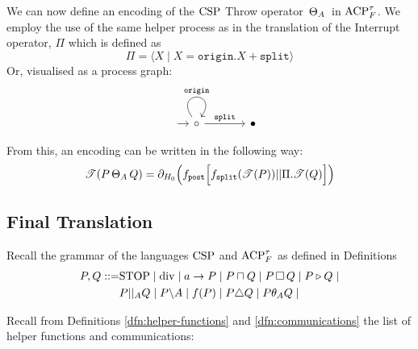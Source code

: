 \documentclass[../hons_project.tex]{subfiles}
\begin{document}
We can now define an encoding of the $\mathrm{CSP}$ Throw operator $\,\Theta_{A}\,$ in $\mathrm{ACP}_{F}^{\tau}$. We employ the use of the same helper process as in the translation of the Interrupt operator, $\Pi$ which is defined as
\[\Pi = \langle X \mid X = \mathtt{origin}.X + \mathtt{split} \rangle\]
Or, visualised as a process graph:
\[\begin{tikzcd}[column sep=scriptsize, row sep=scriptsize]
		{} & \circ && \bullet
		\arrow[shorten <=8pt, from=1-1, to=1-2]
		\arrow["{\mathtt{origin}}", from=1-2, to=1-2, loop, in=55, out=125, distance=10mm]
		\arrow["{\mathtt{split}}", from=1-2, to=1-4]
	\end{tikzcd}\]

From this, an encoding can be written in the following way:
\[\mathscr{T}(P \,\Theta_{A}\, Q) = \partial_{H_{0}}\Bigl(f_{\mathtt{post}}\Bigl[ f_{\mathtt{split}}(\mathscr{T}(P)) | | \Pi.\mathscr{T}(Q) \Bigr]\Bigr)\]





\newpage
\subsection{Final Translation}

Recall the grammar of the languages $\mathrm{CSP}$ and $\mathrm{ACP}_{F}^{\tau}$ as defined in Definitions
\begin{align*}
	P, Q ::= & \mathrm{STOP} \mid \mathrm{div} \mid a\to P \mid P \sqcap Q \mid P \,\square\, Q \mid P \triangleright Q \mid \\
	         & P | |_{A} Q \mid P \backslash A \mid f(P) \mid P \triangle Q \mid P \theta_{A} Q \mid
\end{align*}

\vspace{-10pt}
Recall from Definitions \ref{dfn:helper-functions} and \ref{dfn:communications} the list of helper functions and communications:
\end{document}
